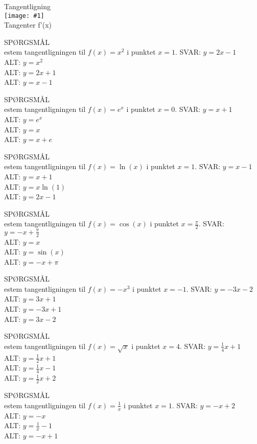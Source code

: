 \documentclass[]{article}
\newcounter{spgcounter}
\newenvironment{question}[2]{\addtocounter{spgcounter}{1} SPØRGSMÅL \thespgcounter\\}{\hspace{50px}}
\newcommand{\name}[1]{{\huge #1}\\}
\newcommand{\tag}[1]{#1}
\newcommand{\cover}[1]{\texttt{[image: \#1]}\\}
\newcommand{\answer}[1]{{\color{green} SVAR: #1}\\}
\newcommand{\alt}[1]{{\color{red} ALT: #1}\\}
\begin{document}
\name{Tangentligning}
\cover{tangentligning.png}
\tag{Tangenter}
\tag{f'(x)}
\begin{question}{multi}

    Bestem tangentligningen til $f(x) = x^2$ i punktet $x = 1$.
    \answer{$y = 2x - 1$}
    \alt{$y = x^2$}
    \alt{$y = 2x + 1$}
    \alt{$y = x - 1$}
    \end{question}
    
    \begin{question}{multi}
    Bestem tangentligningen til $f(x) = e^x$ i punktet $x = 0$.
    \answer{$y = x + 1$}
    \alt{$y = e^x$}
    \alt{$y = x$}
    \alt{$y = x + e$}
    \end{question}
    
    \begin{question}{multi}
    Bestem tangentligningen til $f(x) = \ln(x)$ i punktet $x = 1$.
    \answer{$y = x - 1$}
    \alt{$y = x + 1$}
    \alt{$y = x \ln(1)$}
    \alt{$y = 2x - 1$}
    \end{question}
    
    \begin{question}{multi}
    Bestem tangentligningen til $f(x) = \cos(x)$ i punktet $x = \frac{\pi}{2}$.
    \answer{$y = -x + \frac{\pi}{2}$}
    \alt{$y = x$}
    \alt{$y = \sin(x)$}
    \alt{$y = -x + \pi$}
    \end{question}
    
    \begin{question}{multi}
    Bestem tangentligningen til $f(x) = -x^3$ i punktet $x = -1$.
    \answer{$y = -3x - 2$}
    \alt{$y = 3x + 1$}
    \alt{$y = -3x + 1$}
    \alt{$y = 3x - 2$}
    \end{question}
    
    \begin{question}{multi}
    Bestem tangentligningen til $f(x) = \sqrt{x}$ i punktet $x = 4$.
    \answer{$y = \frac{1}{4}x + 1$}
    \alt{$y = \frac{1}{2}x + 1$}
    \alt{$y = \frac{1}{4}x - 1$}
    \alt{$y = \frac{1}{2}x + 2$}
    \end{question}
        
    \begin{question}{multi}
    Bestem tangentligningen til $f(x) = \frac{1}{x}$ i punktet $x = 1$.
    \answer{$y = -x + 2$}
    \alt{$y = -x$}
    \alt{$y = \frac{1}{x} - 1$}
    \alt{$y = -x + 1$}
    \end{question}
    
\end{document}
